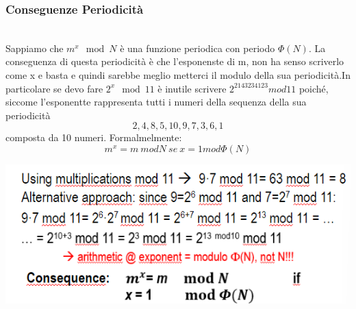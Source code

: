 \documentclass{book}
\theoremstyle{remark}
\begin{document}
\subsubsection{Conseguenze Periodicità}\mbox{}\\ Sappiamo che \(m^x \mod N \) è una funzione periodica con periodo \(\Phi(N)\)\@. La conseguenza di questa periodicità è che l'esponenste di m, non ha senso scriverlo come x e basta e quindi sarebbe meglio metterci il modulo della sua periodicità\@.\newline In particolare se devo fare \(2^x \mod 11\) è inutile scrivere \(2^{2143234123} mod 11\) poiché, siccome l'esponentte rappresenta tutti i numeri della sequenza della sua periodicità \[2,4,8,5,10,9,7,3,6,1\] composta da 10 numeri\@. Formalmelmente:\begin{equation}
	m^x=m\ mod N\ se\ x=1 mod\Phi(N)
\end{equation}
\begin{center}
	\includegraphics[scale=0.6]{2021-12-04-17-01-29.png}
\end{center}
\end{document}
